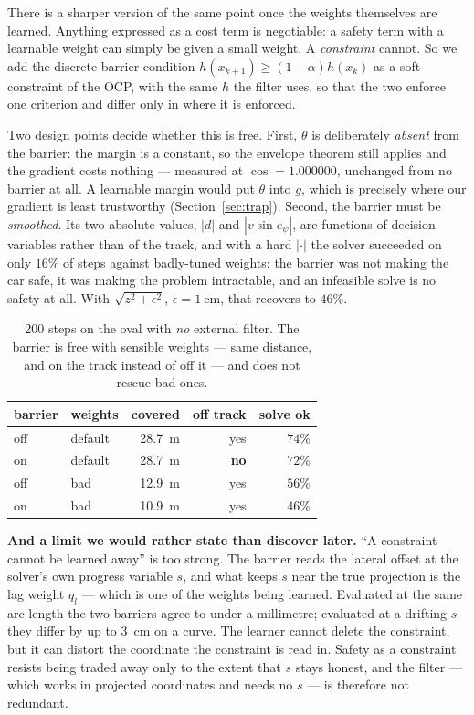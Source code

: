\documentclass[letterpaper, 10 pt, conference]{ieeeconf}
\begin{document}
There is a sharper version of the same point once the weights themselves are
learned. Anything expressed as a cost term is negotiable: a safety term with a
learnable weight can simply be given a small weight. A \emph{constraint} cannot.
So we add the discrete barrier condition
$h(x_{k+1}) \ge (1-\alpha)h(x_k)$ as a soft constraint of the OCP, with the same
$h$ the filter uses, so that the two enforce one criterion and differ only in
where it is enforced.

Two design points decide whether this is free. First, $\theta$ is deliberately
\emph{absent} from the barrier: the margin is a constant, so the envelope
theorem still applies and the gradient costs nothing --- measured at
$\cos = 1.000000$, unchanged from no barrier at all. A learnable margin would
put $\theta$ into $g$, which is precisely where our gradient is least
trustworthy (Section~\ref{sec:trap}). Second, the barrier must be
\emph{smoothed}. Its two absolute values, $|d|$ and $|v\sin e_\psi|$, are
functions of decision variables rather than of the track, and with a hard
$|\cdot|$ the solver succeeded on only $16\%$ of steps against badly-tuned
weights: the barrier was not making the car safe, it was making the problem
intractable, and an infeasible solve is no safety at all. With
$\sqrt{z^2+\epsilon^2}$, $\epsilon = \SI{1}{\centi\meter}$, that recovers to
$46\%$.

\begin{table}[t]
  \centering
  \caption{200 steps on the oval with \emph{no} external filter. The barrier is
  free with sensible weights --- same distance, and on the track instead of off
  it --- and does not rescue bad ones.}
  \label{tab:cbfocp}
  \begin{tabular}{llrrr}
    \toprule
    barrier & weights & covered & off track & solve ok \\
    \midrule
    off & default & \SI{28.7}{\meter} & yes & $74\%$ \\
    on  & default & \SI{28.7}{\meter} & \textbf{no} & $72\%$ \\
    off & bad     & \SI{12.9}{\meter} & yes & $56\%$ \\
    on  & bad     & \SI{10.9}{\meter} & yes & $46\%$ \\
    \bottomrule
  \end{tabular}
\end{table}

\textbf{And a limit we would rather state than discover later.} ``A constraint
cannot be learned away'' is too strong. The barrier reads the lateral offset at
the solver's own progress variable $s$, and what keeps $s$ near the true
projection is the lag weight $q_l$ --- which is one of the weights being
learned. Evaluated at the same arc length the two barriers agree to under a
millimetre; evaluated at a drifting $s$ they differ by up to \SI{3}{\centi\meter}
on a curve. The learner cannot delete the constraint, but it can distort the
coordinate the constraint is read in. Safety as a constraint resists being
traded away only to the extent that $s$ stays honest, and the filter --- which
works in projected coordinates and needs no $s$ --- is therefore not redundant.
\end{document}
